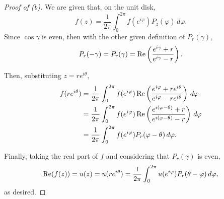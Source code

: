 \documentclass[../hw2]{subfiles}
\begin{document}
\begin{proof}[Proof of (b)]
	We are given that, on the unit disk, \[
		f(z)=\frac{1}{2\pi}\int_{0}^{2\pi} f(e^{i\varphi}) P_z(\varphi) \,d\varphi
		.\]
	Since $\cos{\gamma}$ is even, then with the other given definition of $P_r(\gamma)$,  \[
		P_r(-\gamma)=P_r(\gamma)= \operatorname{Re} \left( \frac{ e^{i\gamma} + r }{e^{i\gamma} - r} \right)
		.\]

	Then, substituting $z=re^{i\theta}$,
	\begin{align*}
		f(re^{i\theta}) & = \frac{1}{2\pi}\int_{0}^{2\pi} f(e^{i\varphi}) \operatorname{Re} \left( \frac{e^{i\varphi} + re^{i\theta}}{e^{i\varphi} - re^{i\theta}} \right) \,d\varphi \\
		                & = \frac{1}{2\pi}\int_{0}^{2\pi} f(e^{i\varphi}) \operatorname{Re} \left( \frac{e^{i(\varphi-\theta)} + r}{e^{i(\varphi-\theta)}-r} \right) \,d\varphi       \\
		                & =  \frac{1}{2\pi}\int_{0}^{2\pi} f(e^{i\varphi}) P_r(\varphi-\theta) \,d\varphi
		.\end{align*}

	Finally, taking the real part of $f$ and considering that $P_r(\gamma)$ is even, \[
		\operatorname{Re}(f(z))=u(z)=u(re^{i\theta})=\frac{1}{2\pi}\int_{0}^{2\pi} u(e^{i\varphi}) P_r(\theta-\varphi)\,d \varphi
		,\] as desired.
\end{proof}
\end{document}
